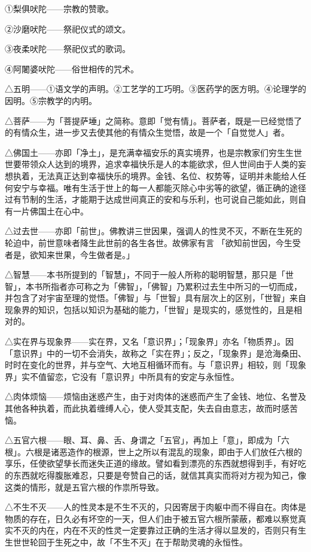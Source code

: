 \documentclass[12pt,twoside,openany]{book}
\begin{document}
①梨俱吠陀——宗教的赞歌。

②沙磨吠陀——祭祀仪式的颂文。

③夜柔吠陀——祭祀仪式的歌词。

④阿闍婆吠陀——俗世相传的咒术。

△五明——①语文学的声明。②工艺学的工巧明。③医药学的医方明。④论理学的因明。⑤宗教学的内明。

△菩萨——为「菩提萨埵」之简称。意即「觉有情」。菩萨者，既是一已经觉悟了的有情众生，进一步又去使其他的有情众生觉悟，故是一个「自觉觉人」者。

△佛国土——亦即「净土」，是充满幸福安乐的真实境界，也是宗教家们穷生生世世要带领众人达到的境界，追求幸福快乐是人的本能欲求，但人世间由于人类的妄想执着，无法真正达到幸福快乐的境界。金钱、名位、权势等，证明并未能给人任何安宁与幸福。唯有生活于世上的每一人都能灭除心中劣等的欲望，循正确的途径过有节制的生活，才能期于达成世间真正的安和与乐利，也可说自己能如此，则自有一片佛国土在心中。

△过去世——亦即「前世」。佛教讲三世因果，强调人的性灵不灭，不断在生死的轮迫中，前世意味者降生此世前的各生各世。故佛家有言	「欲知前世因，今生受者是，欲知来世果，今生做者是。」

△智慧——本书所提到的「智慧」，不同于一般人所称的聪明智慧，那只是「世智」，本书所指者亦可称之为「佛智」，「佛智」乃累积过去生中所习的一切而成，并包含了对宇宙至理的觉悟。「佛智」与「世智」具有层次上的区别，「世智」来自现象界的知识，包括以知识为基础的能力，「世智」是现实的，感觉性的，且是相对的。

△实在界与现象界——实在界，又名「意识界」；「现象界」亦名「物质界」。因「意识界」中的一切不会消失，故称之「实在界」；反之，「现象界」是沧海桑田、时时在变化的世界，并与空气、大地互相循环而有。与「意识界」相较，则「现象界」实不值留恋，它没有「意识界」中所具有的安定与永恒性。

△肉体烦恼——烦恼由迷惑产生，由于对肉体的迷惑而产生了金钱、地位、名誉及其他各种执着，而此执着缠缚人心，使人受其支配，失去自由意志，故而时感苦恼。

△五官六根——眼、耳、鼻、舌、身谓之「五官」，再加上「意」，即成为「六根」。六根是诸恶造作的根源，世上之所以有混乱的现象，即由于人们放任六根的享乐，任使欲望孳长而迷失正道的缘故。譬如看到漂亮的东西就想得到手，有好吃的东西就吃得腹胀难忍，只要是夸赞自己的话，就信其真实而将对方视为知己，像这类的情形，就是五官六根的作祟所导致。

△不生不灭——人的性灵本是不生不灭的，只因寄居于肉躯中而不得自在。肉体是物质的存在，日久必有坏空的一天，但人们由于被五官六根所蒙蔽，都难以察觉真实不灭的内在，内在不灭的性灵一定要靠过正确的生活才得以显发的，否则只有生生世世轮回于生死之中，故「不生不灭」在于帮助灵魂的永恒性。
\end{document}

